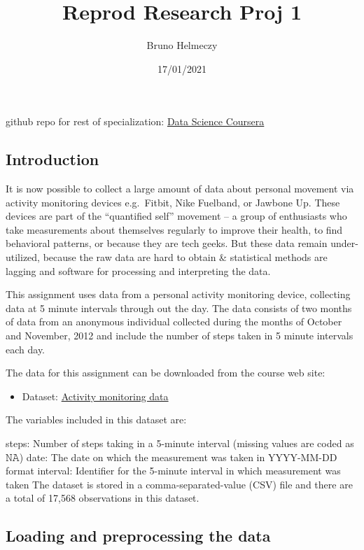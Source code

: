 \documentclass[
]{article}
\title{Reprod Research Proj 1}
\author{Bruno Helmeczy}
\date{17/01/2021}
\providecommand{\tightlist}{%
  \setlength{\itemsep}{0pt}\setlength{\parskip}{0pt}}
\begin{document}
\maketitle

github repo for rest of specialization:
\href{https://github.com/BrunoHelmeczy/JH_-2_R_Prog/tree/master/ReprodResearch}{Data
Science Coursera}

\hypertarget{introduction}{%
\subsection{Introduction}\label{introduction}}

It is now possible to collect a large amount of data about personal
movement via activity monitoring devices e.g.~Fitbit, Nike Fuelband, or
Jawbone Up. These devices are part of the ``quantified self'' movement
-- a group of enthusiasts who take measurements about themselves
regularly to improve their health, to find behavioral patterns, or
because they are tech geeks. But these data remain under-utilized,
because the raw data are hard to obtain \& statistical methods are
lagging and software for processing and interpreting the data.

This assignment uses data from a personal activity monitoring device,
collecting data at 5 minute intervals through out the day. The data
consists of two months of data from an anonymous individual collected
during the months of October and November, 2012 and include the number
of steps taken in 5 minute intervals each day.

The data for this assignment can be downloaded from the course web site:

\begin{itemize}
\tightlist
\item
  Dataset:
  \href{https://d396qusza40orc.cloudfront.net/repdata\%2Fdata\%2Factivity.zip}{Activity
  monitoring data}
\end{itemize}

The variables included in this dataset are:

steps: Number of steps taking in a 5-minute interval (missing values are
coded as 𝙽𝙰) date: The date on which the measurement was taken in
YYYY-MM-DD format interval: Identifier for the 5-minute interval in
which measurement was taken The dataset is stored in a
comma-separated-value (CSV) file and there are a total of 17,568
observations in this dataset.

\hypertarget{loading-and-preprocessing-the-data}{%
\subsection{Loading and preprocessing the
data}\label{loading-and-preprocessing-the-data}}
\end{document}
